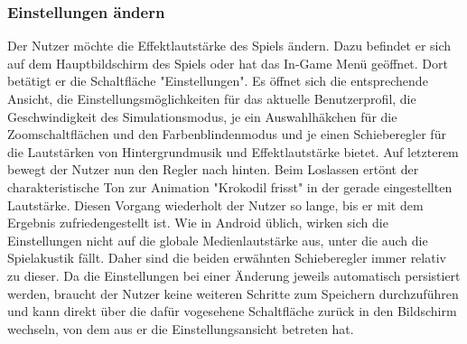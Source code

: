 \subsubsection{Einstellungen ändern}
Der Nutzer möchte die Effektlautstärke des Spiels ändern. Dazu befindet
er sich auf dem Hauptbildschirm des Spiels oder hat das In-Game Menü 
geöffnet. Dort betätigt er die Schaltfläche "Einstellungen".
Es öffnet sich die entsprechende Ansicht, die Einstellungsmöglichkeiten
für das aktuelle Benutzerprofil, die Geschwindigkeit des Simulationsmodus, je
ein Auswahlhäkchen für die Zoomschaltflächen und den Farbenblindenmodus und je einen Schieberegler
für die Lautstärken von Hintergrundmusik und Effektlautstärke bietet.
Auf letzterem bewegt der Nutzer nun den Regler nach hinten. Beim Loslassen
ertönt der charakteristische Ton zur Animation "Krokodil frisst" in der
gerade eingestellten Lautstärke. Diesen Vorgang wiederholt der Nutzer
so lange, bis er mit dem Ergebnis zufriedengestellt ist. Wie in Android 
üblich, wirken sich die Einstellungen nicht auf die globale Medienlautstärke
aus, unter die auch die Spielakustik fällt. Daher sind die beiden erwähnten
Schieberegler immer relativ zu dieser. Da die Einstellungen
bei einer Änderung jeweils automatisch persistiert werden, braucht der
Nutzer keine weiteren Schritte zum Speichern durchzuführen und kann
direkt über die dafür vogesehene Schaltfläche zurück in den Bildschirm
wechseln, von dem aus er die Einstellungsansicht betreten hat.


